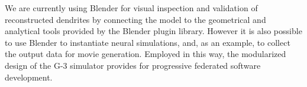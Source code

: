 \documentclass[12pt]{article}
\begin{document}

We are currently using Blender for visual inspection and validation of
reconstructed dendrites by connecting the model to the geometrical and
analytical tools provided by the Blender plugin library.  However it
is also possible to use Blender to instantiate neural simulations,
and, as an example, to collect the output data for movie generation.
Employed in this way, the modularized design of the G-3 simulator
provides for progressive federated software development.



\cleardoublepage
{}

%
%


\end{document}
